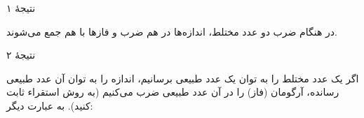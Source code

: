 \EMhold


\begin{EMunit}



\end{EMunit}

\EMhold


\begin{EMunit}



\end{EMunit}

\begin{EMimportant}{}


\end{EMimportant}

\begin{EMremark}{نتیجهٔ ۱}

در هنگام ضرب دو عدد مختلط، اندازه‌ها در هم ضرب و فازها با هم جمع می‌شوند.

\end{EMremark}

\begin{EMremark}{نتیجهٔ ۲}

اگر یک عدد مختلط را به توان یک عدد طبیعی برسانیم، اندازه را به توان آن عدد طبیعی رسانده، آرگومان (فاز) را در آن عدد طبیعی ضرب می‌کنیم (به روش استقراء ثابت کنید). به عبارت دیگر:

\end{EMremark}

